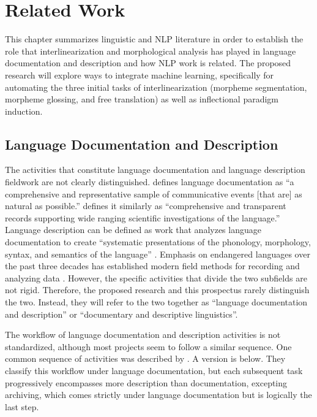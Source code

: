 \chapter{Related Work}
\label{chap:litreview}

This chapter summarizes linguistic and NLP literature in order to establish the role that interlinearization and morphological analysis has played in language documentation and description and how NLP work is related. The proposed research will explore ways to integrate machine learning, specifically for automating the three initial tasks of interlinearization (morpheme segmentation, morpheme glossing, and free translation) as well as inflectional paradigm induction. 

\section{Language Documentation and Description}
\label{sec:LDD}

The activities that constitute language documentation and language description fieldwork are not clearly distinguished. \cite{himmelmann_documentary_1998} defines language documentation as ``a comprehensive and representative sample of communicative events [that are] as natural as possible.” \cite{woodbury_defining_2003} defines it similarly as “comprehensive and transparent records supporting wide ranging scientific investigations of the language.” Language description can be defined as work that analyzes language documentation to create “systematic presentations of the phonology, morphology, syntax, and semantics of the language” \citep{bird_machine_2012}. Emphasis on endangered languages over the past three decades has established modern field methods for recording and analyzing data \citep{bowern_linguistic_2008,czaykowska-higgins_research_2009,lupke_data_2010,vallejos_integrating_2014,rice_community-based_2017}. However, the specific activities that divide the two subfields are not rigid. Therefore, the proposed research and this prospectus rarely distinguish the two. Instead, they will refer to the two together as “language documentation and description” or “documentary and descriptive linguistics”.

The workflow of language documentation and description activities is not standardized, although most projects seem to follow a similar sequence.  One common sequence of activities was described by \citet{bird_machine_2012}. A version is below. They classify this workflow under language documentation, but each subsequent task progressively encompasses more description than documentation, excepting archiving, which comes strictly under language documentation but is logically the last step.

